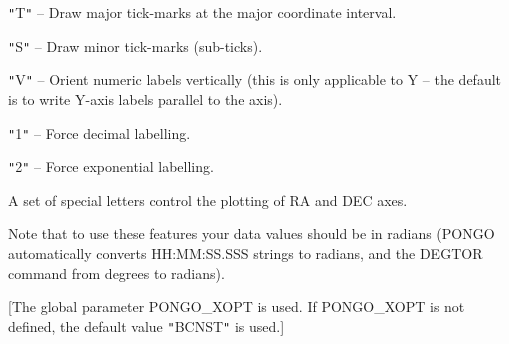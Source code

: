\begin{sloppypar}
{{{{            \sstitem
               {\tt "}T{\tt "} -- Draw major tick-marks at the major coordinate
               interval.

            \sstitem
               {\tt "}S{\tt "} -- Draw minor tick-marks (sub-ticks).

            \sstitem
               {\tt "}V{\tt "} -- Orient numeric labels vertically (this is only
               applicable to Y -- the default is to write Y-axis labels
               parallel to the axis).

            \sstitem
               {\tt "}1{\tt "} -- Force decimal labelling.

            \sstitem
               {\tt "}2{\tt "} -- Force exponential labelling.

         }
         A set of special letters control the plotting of RA and DEC
         axes.

         Note that to use these features your data values should be in
         radians (PONGO automatically converts HH:MM:SS.SSS strings to
         radians, and the DEGTOR command from degrees to radians).

         [The global parameter PONGO\_XOPT is used. If PONGO\_XOPT is not
         defined, the default value {\tt "}BCNST{\tt "} is used.]
      }
      }}
\end{sloppypar}

